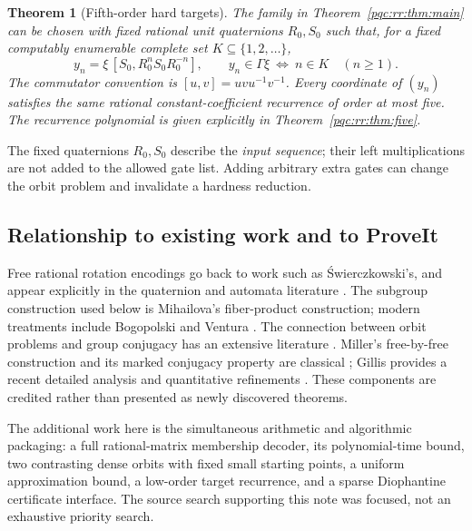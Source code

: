 \documentclass[11pt,letterpaper]{article}
\numberwithin{equation}{section}
\newtheorem{theorem}{Theorem}[section]
\theoremstyle{definition}
\theoremstyle{remark}
\begin{document}
\begin{theorem}[Fifth-order hard targets]\label{pqc:rr:thm:recurrence-main}
The family in Theorem~\ref{pqc:rr:thm:main} can be chosen with fixed rational unit
quaternions $R_0,S_0$ such that, for a fixed computably enumerable complete
set $K\subseteq\{1,2,\ldots\}$,
\begin{equation}\label{pqc:rr:eq:hardsequence}
 y_n=\xi\,[S_0,R_0^nS_0R_0^{-n}],\qquad
 y_n\in\Gamma\xi\ \Longleftrightarrow\ n\in K\quad(n\geq1).
\end{equation}
The commutator convention is $[u,v]=uvu^{-1}v^{-1}$. Every coordinate of
$(y_n)$ satisfies the same rational constant-coefficient recurrence of
order at most five. The recurrence polynomial is given explicitly in
Theorem~\ref{pqc:rr:thm:five}.
\end{theorem}

The fixed quaternions $R_0,S_0$ describe the \emph{input sequence}; their
left multiplications are not added to the allowed gate list. Adding
arbitrary extra gates can change the orbit problem and invalidate a
hardness reduction.

\subsection{Relationship to existing work and to ProveIt}

Free rational rotation encodings go back to work such as
\'{S}wierczkowski's, and appear explicitly in the quaternion and automata
literature \cite{b62s11-Swierczkowski,b62s11-BellHirvensalo}. The subgroup construction
used below is Mihailova's fiber-product construction; modern treatments
include Bogopolski and Ventura \cite{b62-bogopolski-ventura}. The connection
between orbit problems and group conjugacy has an extensive literature
\cite{b62s11-BMV}. Miller's free-by-free construction and its marked conjugacy
property are classical \cite{b62s11-Miller}; Gillis provides a recent detailed
analysis and quantitative refinements \cite{b62s11-Gillis}. These components
are credited rather than presented as newly discovered theorems.

The additional work here is the simultaneous arithmetic and algorithmic
packaging: a full rational-matrix membership decoder, its polynomial-time
bound, two contrasting dense orbits with fixed small starting points,
a uniform approximation bound, a low-order target recurrence, and a
sparse Diophantine certificate interface. The source search supporting
this note was focused, not an exhaustive priority search.
\end{document}
